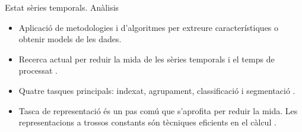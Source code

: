 \begin{frame}{Estat sèries temporals. Anàlisis}

  \begin{itemize}

  \item Aplicació de metodologies i d'algoritmes per extreure
    característiques o obtenir models de les dades.

  \item Recerca actual per reduir la mida de les sèries temporals i el
    temps de processat \parencite{fu11}. 

  \item Quatre tasques principals: indexat, agrupament, classificació i segmentació \parencite{keogh02}.

  \item Tasca de representació és un pas comú que s'aprofita per
    reduir la mida.  Les representacions a trossos constants són
    tècniques eficients en el càlcul \parencite{keogh00}.

  \end{itemize}

\end{frame}



